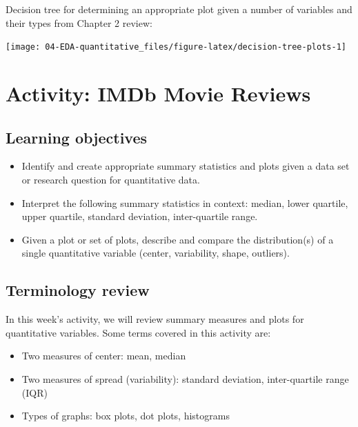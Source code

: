 \documentclass[
]{report}
\newcommand{\rgs}{\vspace{12pt}} %
\begin{document}
\rgs

\newpage

Decision tree for determining an appropriate plot given a number of variables and their types from Chapter 2 review:

\begin{center}\texttt{[image: 04-EDA-quantitative\_files/figure-latex/decision-tree-plots-1]} \end{center}

\newpage

\hypertarget{activity-imdb-movie-reviews}{%
\section{Activity: IMDb Movie Reviews}\label{activity-imdb-movie-reviews}}


\hypertarget{learning-objectives}{%
\subsection{Learning objectives}\label{learning-objectives}}

\begin{itemize}
\item
  Identify and create appropriate summary statistics and plots given a data set or research question for quantitative data.
\item
  Interpret the following summary statistics in context:
  median, lower quartile, upper quartile,
  standard deviation, inter-quartile range.
\item
  Given a plot or set of plots, describe and compare the distribution(s) of a single quantitative variable (center, variability, shape, outliers).
\end{itemize}

\hypertarget{terminology-review-3}{%
\subsection{Terminology review}\label{terminology-review-3}}

In this week's activity, we will review summary measures and plots for quantitative variables. Some terms covered in this activity are:

\begin{itemize}
\item
  Two measures of center: mean, median
\item
  Two measures of spread (variability): standard deviation, inter-quartile range (IQR)
\item
  Types of graphs: box plots, dot plots, histograms
\end{itemize}
\end{document}

